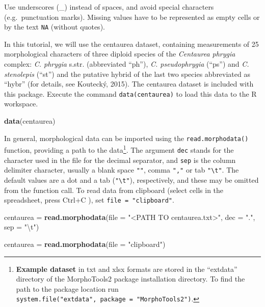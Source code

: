 \documentclass[
]{article}
\newenvironment{Shaded}{\begin{snugshade}}{\end{snugshade}}
\newcommand{\CharTok}[1]{\textcolor[rgb]{0.31,0.60,0.02}{#1}}
\newcommand{\DataTypeTok}[1]{\textcolor[rgb]{0.13,0.29,0.53}{#1}}
\newcommand{\KeywordTok}[1]{\textcolor[rgb]{0.13,0.29,0.53}{\textbf{#1}}}
\newcommand{\NormalTok}[1]{#1}
\newcommand{\StringTok}[1]{\textcolor[rgb]{0.31,0.60,0.02}{#1}}
\begin{document}
Use underscores (\_) instead of spaces, and avoid special characters
(e.g.~punctuation marks). Missing values have to be represented as empty
cells or by the text \texttt{NA} (without quotes).

In this tutorial, we will use the centaurea dataset, containing
measurements of 25 morphological characters of three diploid species of
the \emph{Centaurea phrygia} complex: \emph{C. phrygia} s.str.
(abbreviated ``ph''), \emph{C. pseudophrygia} (``ps'') and \emph{C.
stenolepis} (``st'') and the putative hybrid of the last two species
abbreviated as ``hybr'' (for details, see Koutecký, 2015). The centaurea
dataset is included with this package. Execute the command
\texttt{data(centaurea)} to load this data to the R workspace.

\begin{Shaded}
\begin{Highlighting}[]
\KeywordTok{data}\NormalTok{(centaurea)}
\end{Highlighting}
\end{Shaded}

In general, morphological data can be imported using the
\texttt{read.morphodata()} function, providing a path to the
data\footnote{\textbf{Example dataset} in txt and xlsx formats are
  stored in the ``extdata'' directory of the MorphoTools2 package
  installation directory. To find the path to the package location run
  \texttt{system.file("extdata",\ package\ =\ "MorphoTools2")}.}. The
argument \texttt{dec} stands for the character used in the file for the
decimal separator, and \texttt{sep} is the column delimiter character,
usually a blank space \texttt{""}, comma \texttt{","} or tab
\texttt{"\textbackslash{}t"}. The default values are a dot and a tab
(\texttt{"\textbackslash{}t"}), respectively, and these may be omitted
from the function call. To read data from clipboard (select cells in the
spreadsheet, press Ctrl+C ), set \texttt{file\ =\ "clipboard"}.

\begin{Shaded}
\begin{Highlighting}[]
\NormalTok{centaurea =}\StringTok{ }\KeywordTok{read.morphodata}\NormalTok{(}\DataTypeTok{file =} \StringTok{"<PATH TO centaurea.txt>"}\NormalTok{, }\DataTypeTok{dec =} \StringTok{"."}\NormalTok{, }\DataTypeTok{sep =} \StringTok{"}\CharTok{\textbackslash{}t}\StringTok{"}\NormalTok{)}

\NormalTok{centaurea =}\StringTok{ }\KeywordTok{read.morphodata}\NormalTok{(}\DataTypeTok{file =} \StringTok{"clipboard"}\NormalTok{)}
\end{Highlighting}
\end{Shaded}
\end{document}
